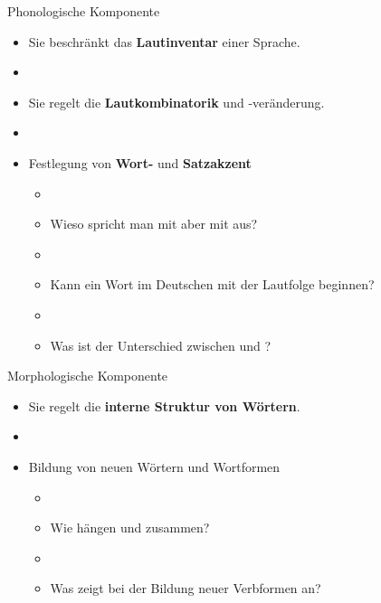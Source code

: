 %
%

\begin{frame}{Phonologische Komponente}

	\begin{itemize}
		\item Sie beschränkt das \textbf{Lautinventar} einer Sprache.
		\item[]
		\item Sie regelt die \textbf{Lautkombinatorik} und -veränderung.
		\item[]
		\item Festlegung von \textbf{Wort-} und \textbf{Satzakzent}

		\begin{itemize}
			\item[]
			\item<2->[$\rightarrow$] Wieso spricht man  mit \textipa{[t]} aber  mit \textipa{[d]} aus?
			\item[]
			\item<3->[$\rightarrow$] Kann ein Wort im Deutschen mit der Lautfolge \textipa{[Ng]} beginnen?
			\item[]
			\item<4->[$\rightarrow$] Was ist der Unterschied zwischen  und ?
		\end{itemize}		  
	
	\end{itemize}
	
\end{frame}


%
%

\begin{frame}{Morphologische Komponente}

\begin{itemize}
	\item Sie regelt die \textbf{interne Struktur von Wörtern}.
	\item[]
	\item Bildung von neuen Wörtern und Wortformen
				
	\begin{itemize}
		\item[]
		\item<2->[$\rightarrow$] Wie hängen  und  zusammen?
		\item[]
		\item<3->[$\rightarrow$] Was zeigt  bei der Bildung neuer Verbformen an?
	\end{itemize}
			
\end{itemize}

\end{frame}


